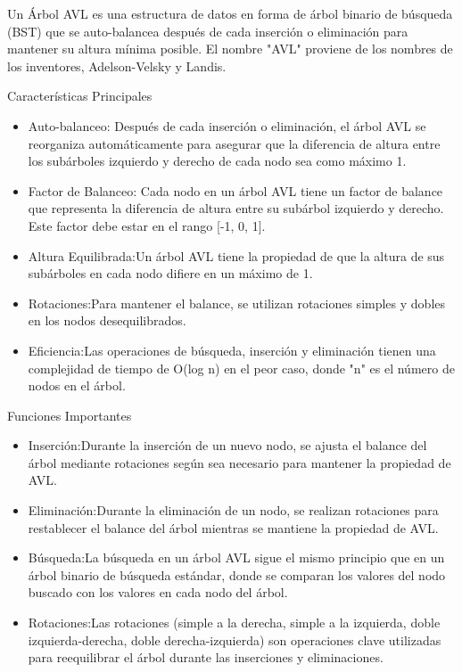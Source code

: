 \documentclass[12pt]{article}
\begin{document}
Un Árbol AVL es una estructura de datos en forma de árbol binario de búsqueda (BST) que se auto-balancea después de cada inserción o eliminación para mantener su altura mínima posible. El nombre "AVL" proviene de los nombres de los inventores, Adelson-Velsky y Landis.

Características Principales
\begin{itemize}
    \item Auto-balanceo: Después de cada inserción o eliminación, el árbol AVL se reorganiza automáticamente para asegurar que la diferencia de altura entre los subárboles izquierdo y derecho de cada nodo sea como máximo 1.
    
    \item Factor de Balanceo: Cada nodo en un árbol AVL tiene un factor de balance que representa la diferencia de altura entre su subárbol izquierdo y derecho. Este factor debe estar en el rango [-1, 0, 1].

    \item Altura Equilibrada:Un árbol AVL tiene la propiedad de que la altura de sus subárboles en cada nodo difiere en un máximo de 1.
    
    \item Rotaciones:Para mantener el balance, se utilizan rotaciones simples y dobles en los nodos desequilibrados.
    
    \item Eficiencia:Las operaciones de búsqueda, inserción y eliminación tienen una complejidad de tiempo de O(log n) en el peor caso, donde "n" es el número de nodos en el árbol.
\end{itemize}

Funciones Importantes

\begin{itemize}
    \item Inserción:Durante la inserción de un nuevo nodo, se ajusta el balance del árbol mediante rotaciones según sea necesario para mantener la propiedad de AVL.
    
    \item Eliminación:Durante la eliminación de un nodo, se realizan rotaciones para restablecer el balance del árbol mientras se mantiene la propiedad de AVL.

    \item Búsqueda:La búsqueda en un árbol AVL sigue el mismo principio que en un árbol binario de búsqueda estándar, donde se comparan los valores del nodo buscado con los valores en cada nodo del árbol.
    
    \item Rotaciones:Las rotaciones (simple a la derecha, simple a la izquierda, doble izquierda-derecha, doble derecha-izquierda) son operaciones clave utilizadas para reequilibrar el árbol durante las inserciones y eliminaciones.
\end{itemize}
\end{document}
